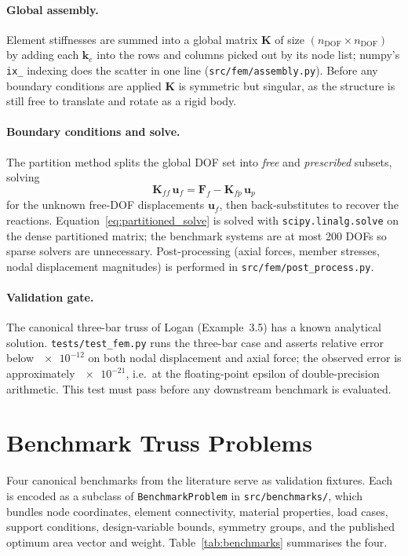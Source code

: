 \paragraph{Global assembly.} Element stiffnesses are summed into a
global matrix $\mathbf{K}$ of size
$(n_\text{DOF}\times n_\text{DOF})$ by adding each
$\mathbf{k}_e$ into the rows and columns picked out by its node
list; numpy's \texttt{ix\_} indexing does the scatter in one
line (\texttt{src/fem/assembly.py}). Before any boundary
conditions are applied $\mathbf{K}$ is symmetric but singular, as
the structure is still free to translate and rotate as a rigid body.

\paragraph{Boundary conditions and solve.} The partition method
splits the global DOF set into \emph{free} and \emph{prescribed}
subsets, solving
\begin{equation}
    \mathbf{K}_{ff}\,\mathbf{u}_{f} =
    \mathbf{F}_{f} - \mathbf{K}_{fp}\,\mathbf{u}_{p}
    \label{eq:partitioned_solve}
\end{equation}
for the unknown free-DOF displacements $\mathbf{u}_f$, then
back-substitutes to recover the reactions.
Equation~\eqref{eq:partitioned_solve} is solved with
\texttt{scipy.linalg.solve} on the dense partitioned matrix;
the benchmark systems are at most \num{200} DOFs so sparse solvers
are unnecessary. Post-processing (axial forces, member stresses,
nodal displacement magnitudes) is performed in
\texttt{src/fem/post\_process.py}.

\paragraph{Validation gate.} The canonical three-bar truss of
Logan (Example~3.5) has a known analytical solution.
\texttt{tests/test\_fem.py} runs the three-bar case and asserts
relative error below $\num{e-12}$ on both nodal displacement and
axial force; the observed error is approximately $\num{e-21}$, i.e.\
at the floating-point epsilon of double-precision arithmetic. This
test must pass before any downstream benchmark is evaluated.

\section{Benchmark Truss Problems}
\label{sec:method:benchmarks}

Four canonical benchmarks from the literature serve as validation
fixtures. Each is encoded as a subclass of
\texttt{BenchmarkProblem} in \texttt{src/benchmarks/}, which
bundles node coordinates, element connectivity, material
properties, load cases, support conditions, design-variable
bounds, symmetry groups, and the published optimum area vector
and weight. Table~\ref{tab:benchmarks} summarises the four.

